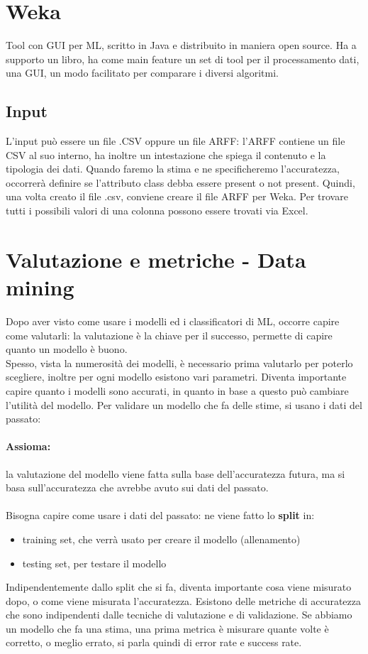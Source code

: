 \documentclass{article}
\begin{document}
\section{Weka}
Tool con GUI per ML, scritto in Java e distribuito in maniera open source. Ha a supporto un libro, ha come main feature un set di tool per il processamento dati, una GUI, un modo facilitato per comparare i diversi algoritmi.
\subsection{Input}
L'input può essere un file .CSV oppure un file ARFF: l'ARFF contiene un file CSV al suo interno, ha inoltre un intestazione che spiega il contenuto e la tipologia dei dati. Quando faremo la stima e ne specificheremo l'accuratezza, occorrerà definire se l'attributo class debba essere present o not present. Quindi, una volta creato il file .csv, conviene creare il file ARFF per Weka. Per trovare tutti i possibili valori di una colonna possono essere trovati via Excel. 
\section{Valutazione e metriche - Data mining}
Dopo aver visto come usare i modelli ed i classificatori di ML, occorre capire come valutarli: la valutazione è la chiave per il successo, permette di capire quanto un modello è buono.\\ Spesso, vista la numerosità dei modelli, è necessario prima valutarlo per poterlo scegliere, inoltre per ogni modello esistono vari parametri. Diventa importante capire quanto i modelli sono accurati, in quanto in base a questo può cambiare l'utilità del modello. Per validare un modello che fa delle stime, si usano i dati del passato: 
\paragraph{Assioma:}la valutazione del modello viene fatta sulla base dell'accuratezza futura, ma si basa sull'accuratezza che avrebbe avuto sui dati del passato.\\\\ Bisogna capire come usare i dati del passato: ne viene fatto lo \textbf{split} in:
\begin{itemize}
\item training set, che verrà usato per creare il modello (allenamento)
\item testing set, per testare il modello 
\end{itemize}
Indipendentemente dallo split che si fa, diventa importante cosa viene misurato dopo, o come viene misurata l'accuratezza. Esistono delle metriche di accuratezza che sono indipendenti dalle tecniche di valutazione e di validazione. Se abbiamo un modello che fa una stima, una prima metrica è misurare quante volte è corretto, o meglio errato, si parla quindi di error rate e success rate.
\end{document}
